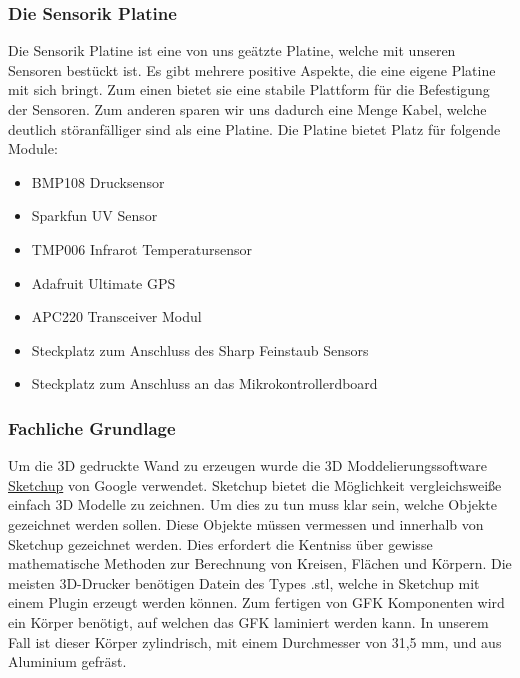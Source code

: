 \subsubsection{Die Sensorik Platine}
Die Sensorik Platine ist eine von uns geätzte Platine, welche mit unseren Sensoren bestückt ist. Es gibt mehrere positive Aspekte, die eine eigene Platine mit sich bringt. Zum einen bietet sie eine stabile Plattform für die Befestigung der Sensoren. Zum anderen sparen wir uns dadurch eine Menge Kabel, welche deutlich störanfälliger sind als eine Platine. Die Platine bietet Platz für folgende Module:

\begin{itemize}
	\item BMP108 Drucksensor
	\item Sparkfun UV Sensor
	\item TMP006 Infrarot Temperatursensor
	\item Adafruit Ultimate GPS
	\item APC220 Transceiver Modul
	\item Steckplatz zum Anschluss des Sharp Feinstaub Sensors
	\item Steckplatz zum Anschluss an das Mikrokontrollerdboard
\end{itemize}

\subsubsection {Fachliche Grundlage}
Um die 3D gedruckte Wand zu erzeugen wurde die 3D Moddelierungssoftware \href{http://www.sketchup.com/de} {Sketchup} von Google verwendet. Sketchup bietet die Möglichkeit vergleichsweiße einfach 3D Modelle zu zeichnen. Um dies zu tun muss klar sein, welche Objekte gezeichnet werden sollen. Diese Objekte müssen vermessen und innerhalb von Sketchup gezeichnet werden. Dies erfordert die Kentniss über gewisse mathematische Methoden zur Berechnung von Kreisen, Flächen und Körpern. Die meisten 3D-Drucker benötigen Datein des Types .stl, welche in Sketchup mit einem Plugin erzeugt werden können.
Zum fertigen von GFK Komponenten wird ein Körper benötigt, auf welchen das GFK laminiert werden kann. In unserem Fall ist dieser Körper zylindrisch, mit einem Durchmesser von 31,5 mm, und aus Aluminium gefräst.

